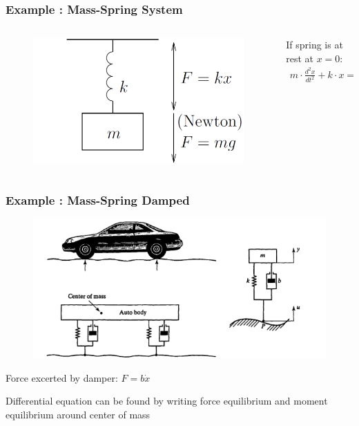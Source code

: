 \begin{frame}
	\frametitle{Example : Mass-Spring System} 
	
	\begin{columns}
		\begin{column}{0.4\linewidth}
			\begin{figure}
				\centering
				\includegraphics[width=1\linewidth]{img/mass-spring}
				\label{fig:mass-spring}
			\end{figure}
		\end{column}
		\begin{column}{0.6\linewidth}
			If spring is at rest at $x=0$:
			\begin{align*}
			m \cdot \frac{d^{2}x}{dt^{2}} + k \cdot x =  m \cdot g \\
			\end{align*}
		\end{column}
	\end{columns}
\end{frame}


\begin{frame}
	\frametitle{Example : Mass-Spring Damped}
	\begin{figure}
		\centering
		\includegraphics[width=1\linewidth]{img/mass-spring-damped}
		\label{fig:mass-spring-damped}
	\end{figure}
	Force excerted by damper: $F = b\dot{x}$
	
	Differential equation can be found by writing force equilibrium and moment equilibrium around center of mass
	
\end{frame}

